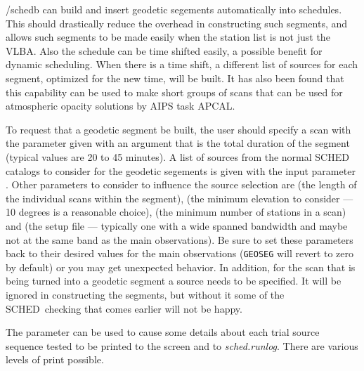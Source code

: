 \documentclass{report}
\newcommand{\schedb}{{\sc SCHED~}}
\begin{document}
/schedb can build and insert geodetic segements automatically into
schedules.  This should drastically reduce the overhead in
constructing such segments, and allows such segments to be made easily
when the station list is not just the VLBA.  Also the schedule can be
time shifted easily, a possible benefit for dynamic scheduling.  When
there is a time shift, a different list of sources for each segment,
optimized for the new time, will be built.  It has also been found that
this capability can be used to make short groups of scans that can
be used for atmospheric opacity solutions by AIPS task APCAL.

To request that a geodetic segment be built, the user should specify a
scan with the parameter  given with
an argument that is the total duration of the segment (typical values
are 20 to 45 minutes).  A list of sources from the normal \schedb
catalogs to consider for the geodetic segements is given with the
input parameter .  Other parameters
to consider to influence the source selection are  (the length of the individual scans within the
segment),  (the minimum elevation
to consider --- 10 degrees is a reasonable choice),  (the minimum number of stations in a scan) and
 (the setup file --- typically one with
a wide spanned bandwidth and maybe not at the same band as the main
observations).  Be sure to set these parameters back to their desired
values for the main observations ({\tt GEOSEG} will revert to zero by
default) or you may get unexpected behavior.  In addition, for the
scan that is being turned into a geodetic segment a source needs to be
specified.  It will be ignored in constructing the segments, but
without it some of the \schedb checking that comes earlier will not be
happy.

The parameter  can be used to cause
some details about each trial source sequence tested to be printed to
the screen and to {\sl sched.runlog}.  There are various levels of
print possible.
\end{document}
